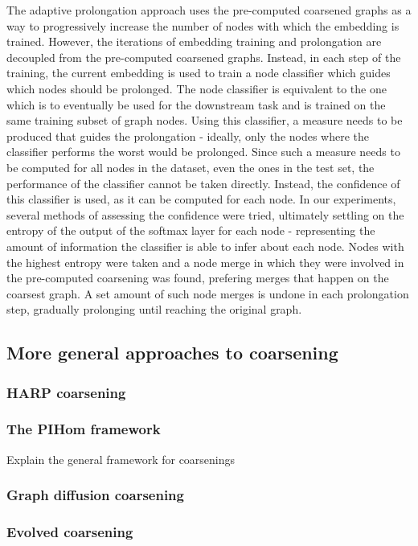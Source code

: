 The adaptive prolongation approach uses the pre-computed coarsened graphs as a way to progressively increase the number of nodes with which the embedding is trained. However, the iterations of embedding training and prolongation are decoupled from the pre-computed coarsened graphs. Instead, in each step of the training, the current embedding is used to train a node classifier which guides which nodes should be prolonged. The node classifier is equivalent to the one which is to eventually be used for the downstream task and is trained on the same training subset of graph nodes. Using this classifier, a measure needs to be produced that guides the prolongation - ideally, only the nodes where the classifier performs the worst would be prolonged. Since such a measure needs to be computed for all nodes in the dataset, even the ones in the test set, the performance of the classifier cannot be taken directly. Instead, the confidence of this classifier is used, as it can be computed for each node. In our experiments, several methods of assessing the confidence were tried, ultimately settling on the entropy of the output of the softmax layer for each node - representing the amount of information the classifier is able to infer about each node. Nodes with the highest entropy were taken and a node merge in which they were involved in the pre-computed coarsening was found, prefering merges that happen on the coarsest graph. A set amount of such node merges is undone in each prolongation step, gradually prolonging until reaching the original graph.

\subsection{More general approaches to coarsening}\label{sec:coarsening-algorithms}

\subsubsection{HARP coarsening}\label{sec:harp-coarsening}

\subsubsection{The PIHom framework}
Explain the general framework for coarsenings

\subsubsection{Graph diffusion coarsening}

\subsubsection{Evolved coarsening}

